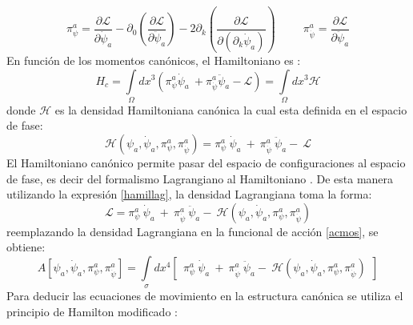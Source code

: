 \documentclass[a4paper,12pt]{article}
\begin{document}
\begin{equation}
\pi^{a}_{\psi}=\frac{\partial \mathscr{L} }{\partial\dot \psi_a}-\partial_{0}\left(\frac{\partial\mathscr{L} }{\partial\ddot \psi_a}  \right)-2\partial_{k}\left(\frac{\partial\mathscr{L} }{\partial(\partial_{k}\dot \psi_a)}\right)\ \ \ \ \ \ \ \ \ \ \ \pi^{a}_{\dot\psi}=\frac{\partial \mathscr{L} }{\partial\ddot \psi_a} 
\end{equation}
En función de los momentos canónicos, el Hamiltoniano es \cite{general,podolsky}:
\begin{equation}
H_c=\int\limits_{\Omega}dx^{3}\left(\pi^{a}_{\psi}\dot\psi_a\ +\pi^{a}_{\dot\psi} \ddot\psi_a-\mathscr{L}\right)=\int\limits_{\Omega}dx^{3}\mathscr{H} 
\end{equation}
donde $\mathscr{H}$ es la densidad Hamiltoniana canónica la cual esta definida en el espacio de fase:
\begin{equation}
\mathscr{H}(\psi_a,\dot\psi_a,\pi^{a}_{\psi},\pi^{a}_{\dot\psi})=\pi^{a}_{\psi} \ \dot\psi_a\ +\ \pi^{a}_{\dot\psi} \ \ddot\psi_a -\ \mathscr{L} 
\label{hamillag}
\end{equation}
El Hamiltoniano canónico permite pasar del espacio de configuraciones al espacio de fase, es decir del formalismo Lagrangiano al Hamiltoniano \cite{general,hamilton,canoalor,tesis}. De esta manera utilizando la expresión \eqref{hamillag}, la densidad Lagrangiana toma la forma:
\begin{equation}
\mathscr{L}=\pi^{a}_{\psi} \ \dot\psi_a\ +\ \pi^{a}_{\dot\psi} \ \ddot\psi_a -\ \mathscr{H}(\psi_a,\dot\psi_a,\pi^{a}_{\psi},\pi^{a}_{\dot\psi})
\label{laghal} 
\end{equation}
reemplazando la densidad Lagrangiana en la funcional de acción \eqref{acmos}, se obtiene:
\begin{equation}
A[\psi_a,\dot\psi_a,\pi^{a}_{\psi},\pi^{a}_{\dot\psi}]=\int\limits_{\sigma}dx^4\left[\ \ \pi^{a}_{\psi} \ \dot\psi_a\ +\ \pi^{a}_{\dot\psi} \ \ddot\psi_a -\ \mathscr{H}(\psi_a,\dot\psi_a,\pi^{a}_{\psi},\pi^{a}_{\dot\psi})\ \ \right] 
\label{acmo}
\end{equation}
Para deducir las ecuaciones de movimiento en la estructura canónica se utiliza el principio de Hamilton modificado \cite{general,canoalor,tesis,hamilmodi}:
\begin{center}
\end{center}
\end{document}
